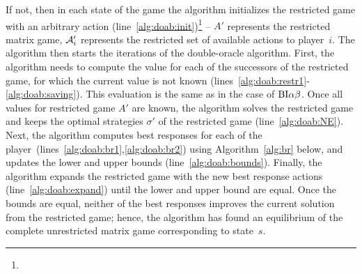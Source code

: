 If not, then in each state of the game the algorithm initializes the restricted game with an arbitrary action (line~\ref{alg:doab:init})\footnote{} -- $A'$ represents the restricted matrix game, $\mathcal{A}'_i$ represents the restricted set of available actions to player~$i$.
The algorithm then starts the iterations of the double-oracle algorithm.
First, the algorithm needs to compute the value for each of the successors of the restricted game, for which the current value is not known (lines~\ref{alg:doab:restr1}-\ref{alg:doab:saving}). This evaluation is the same as in the case of $\textrm{BI}\alpha\beta$. %
Once all values for restricted game $A'$ are known, the algorithm solves the restricted game and keeps the optimal strategies $\sigma'$ of the restricted game (line~\ref{alg:doab:NE}).
Next, the algorithm computes best responses for each of the player~(lines~\ref{alg:doab:br1},\ref{alg:doab:br2}) using Algorithm~\ref{alg:br} below, and updates the lower and upper bounds (line~\ref{alg:doab:bounds}). Finally, the algorithm expands the restricted game with the new best response actions (line~\ref{alg:doab:expand}) until the lower and upper bound are equal.
Once the bounds are equal, neither of the best responses improves the current solution from the restricted game; hence, the algorithm has found an equilibrium of the complete unrestricted matrix game corresponding to state~$s$.

